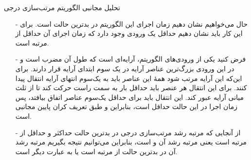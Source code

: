 \begin{frame}{‌تحلیل مجانبی الگوریتم‌ مرتب‌سازی درجی}
\begin{itemize}\itemr
\item[-]
حال می‌خواهیم نشان دهیم زمان اجرای این الگوریتم در بدترین حالت
است. برای این کار باید نشان دهیم حداقل یک ورودی وجود دارد که زمان اجرای آن حداقل از مرتبه
است.
\item[-]
فرض کنید یکی از ورودی‌های الگوریتم، آرایه‌ای است که طول آن مضرب 
 است و در این ورودی بزرگ‌ترین عناصر آرایه در یک سوم ابتدای آرایه قرار دارند. برای این‌که این آرایه مرتب شود همهٔ این عناصر باید به یک‌سوم انتهای آرایه انتقال پیدا کنند. برای این انتقال هر عنصر باید حداقل
بار به سمت راست حرکت کند تا از ثلث میانی آرایه عبور کند. این انتقال باید برای حداقل یک‌سوم عناصر اتفاق بیافتد، پس زمان اجرا در این حالت حداقل
است، بنابراین
و
 طبق تعریف کران پایین مجانبی
است.
\item[-]
از آنجایی که مرتبه رشد مرتب‌سازی درجی در بدترین حالت حداکثر و حداقل از مرتبه
است یعنی مرتبه رشد آن
و
است، بنابراین می‌توانیم نتیجه بگیریم مرتبه رشد آن در بدترین حالت از مرتبه
است یا به عبارت دیگر
است.
\end{itemize}
\end{frame}